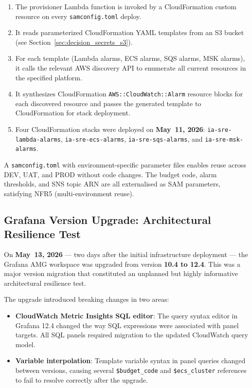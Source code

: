 \begin{enumerate}
    \item The provisioner Lambda function is invoked by a CloudFormation
          custom resource on every \texttt{samconfig.toml} deploy.

    \item It reads parameterized CloudFormation YAML templates from an
          S3 bucket (see Section~\ref{sec:decision_secrets_s3}).

    \item For each template (Lambda alarms, ECS alarms, SQS alarms, MSK
          alarms), it calls the relevant AWS discovery API to enumerate
          all current resources in the specified platform.

    \item It synthesizes CloudFormation \texttt{AWS::CloudWatch::Alarm}
          resource blocks for each discovered resource and passes the
          generated template to CloudFormation for stack deployment.

    \item Four CloudFormation stacks were deployed on
          \textbf{May~11, 2026}: \texttt{ia-sre-lambda-alarms},
          \texttt{ia-sre-ecs-alarms}, \texttt{ia-sre-sqs-alarms}, and
          \texttt{ia-sre-msk-alarms}.
\end{enumerate}

A \texttt{samconfig.toml} with environment-specific parameter files
enables reuse across DEV, UAT, and PROD without code changes. The budget
code, alarm thresholds, and SNS topic ARN are all externalised as
SAM parameters, satisfying NFR5 (multi-environment reuse).

\subsection{Grafana Version Upgrade: Architectural Resilience Test}

On \textbf{May~13, 2026} --- two days after the initial infrastructure
deployment --- the Grafana AMG workspace was upgraded from version
\textbf{10.4 to 12.4}. This was a major version migration that
constituted an unplanned but highly informative architectural resilience
test.

The upgrade introduced breaking changes in two areas:

\begin{itemize}
    \item \textbf{CloudWatch Metric Insights SQL editor}: The query
          syntax editor in Grafana 12.4 changed the way SQL expressions
          were associated with panel targets. All SQL panels required
          migration to the updated CloudWatch query model.

    \item \textbf{Variable interpolation}: Template variable syntax
          in panel queries changed between versions, causing several
          \texttt{\$budget\_code} and \texttt{\$ecs\_cluster} references
          to fail to resolve correctly after the upgrade.
\end{itemize}

